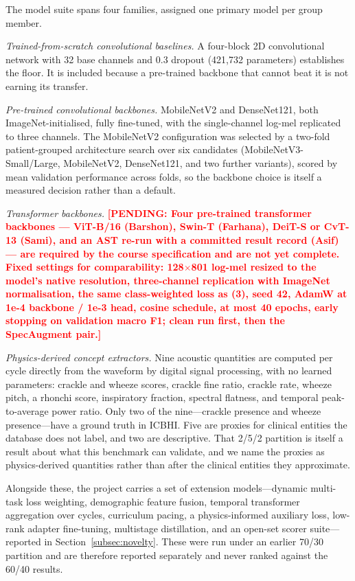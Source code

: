 \documentclass[journal,onecolumn]{IEEEtran}
\newcommand{\pending}[1]{\textcolor{red}{\textbf{[PENDING: #1]}}}
\begin{document}
The model suite spans four families, assigned one primary model per group member.

\emph{Trained-from-scratch convolutional baselines.} A four-block 2D convolutional
network with 32 base channels and 0.3 dropout (421{,}732 parameters) establishes the
floor. It is included because a pre-trained backbone that cannot beat it is not
earning its transfer.

\emph{Pre-trained convolutional backbones.} MobileNetV2 and DenseNet121, both
ImageNet-initialised, fully fine-tuned, with the single-channel log-mel replicated to
three channels. The MobileNetV2 configuration was selected by a two-fold
patient-grouped architecture search over six candidates (MobileNetV3-Small/Large,
MobileNetV2, DenseNet121, and two further variants), scored by mean validation
performance across folds, so the backbone choice is itself a measured decision rather
than a default.

\emph{Transformer backbones.} \pending{Four pre-trained transformer backbones --- ViT-B/16
(Barshon), Swin-T (Farhana), DeiT-S or CvT-13 (Sami), and an AST re-run with a committed
result record (Asif) --- are required by the course specification and are not yet
complete. Fixed settings for comparability: 128$\times$801 log-mel resized to the model's
native resolution, three-channel replication with ImageNet normalisation, the same
class-weighted loss as (3), seed 42, AdamW at 1e-4 backbone / 1e-3 head, cosine
schedule, at most 40 epochs, early stopping on validation macro F1; clean run first,
then the SpecAugment pair.}

\emph{Physics-derived concept extractors.} Nine acoustic quantities are computed per
cycle directly from the waveform by digital signal processing, with no learned
parameters: crackle and wheeze scores, crackle fine ratio, crackle rate, wheeze
pitch, a rhonchi score, inspiratory fraction, spectral flatness, and temporal
peak-to-average power ratio. Only two of the nine---crackle presence and wheeze
presence---have a ground truth in ICBHI. Five are proxies for clinical entities the
database does not label, and two are descriptive. That 2/5/2 partition is itself a
result about what this benchmark can validate, and we name the proxies as
physics-derived quantities rather than after the clinical entities they approximate.

Alongside these, the project carries a set of extension models---dynamic multi-task
loss weighting, demographic feature fusion, temporal transformer aggregation over
cycles, curriculum pacing, a physics-informed auxiliary loss, low-rank adapter
fine-tuning, multistage distillation, and an open-set scorer suite---reported in
Section~\ref{subsec:novelty}. These were run under an earlier 70/30 partition and are
therefore reported separately and never ranked against the 60/40 results.
\end{document}
